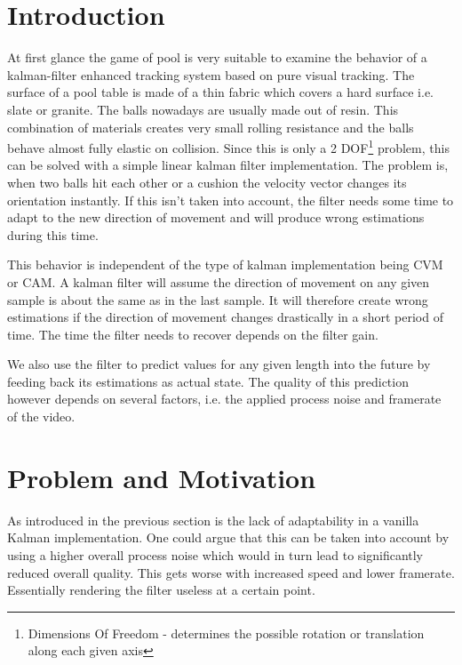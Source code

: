 \documentclass[titlepage, a4paper, 11pt]{scrartcl}
\begin{document}
\begin{multicols}{2}

    \section{Introduction}
    At first glance the game of pool is very suitable to examine the behavior of a kalman-filter enhanced tracking system based on pure visual tracking. 
    The surface of a pool table is made of a thin fabric which covers a hard surface i.e. slate or granite.
    The balls nowadays are usually made out of resin. This combination of materials creates very small rolling resistance and the balls behave almost fully elastic on collision.
    Since this is only a 2 DOF\footnote{Dimensions Of Freedom - determines the possible rotation or translation along each given axis} problem, this can be solved with a simple linear kalman filter implementation. 
    The problem is, when two balls hit each other or a cushion the velocity vector changes its orientation instantly. 
    If this isn't taken into account, the filter needs some time to adapt to the new direction of movement and will produce wrong estimations during this time.

    This behavior is independent of the type of kalman implementation being CVM or CAM.
    A kalman filter will assume the direction of movement on any given sample is about the same as in the last sample. 
    It will therefore create wrong estimations if the direction of movement changes drastically in a short period of time. The time the filter needs to recover depends on the filter gain.

    We also use the filter to predict values for any given length into the future by feeding back its estimations as actual state. 
    The quality of this prediction however depends on several factors, i.e. the applied process noise and framerate of the video.

    \section{Problem and Motivation}
    As introduced in the previous section is the lack of adaptability in a vanilla Kalman implementation.
    One could argue that this can be taken into account by using a higher overall process noise which would in turn lead to significantly reduced overall quality.
    This gets worse with increased speed and lower framerate. Essentially rendering the filter useless at a certain point.


\end{multicols}
\end{document}
